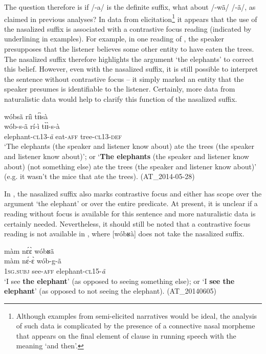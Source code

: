 \documentclass[output=paper]{langsci/langscibook}
\begin{document}
The question therefore is if /-a/ is the definite suffix, what about /-wã/ {\Tilde} /-ã/, as claimed in previous analyses? In data from elicitation\footnote{Although examples from semi-elicited narratives would be ideal, the analysis of such data is complicated by the presence of a connective nasal morpheme that appears on the final element of clause in running speech with the meaning ‘and then’.} it appears that the use of the nasalized suffix is associated with a contrastive focus reading (indicated by underlining in examples). For example, in one reading of , the speaker presupposes that the listener believes some other entity to have eaten the trees. The nasalized suffix therefore highlights the argument ‘the elephants’ to correct this belief. However, even with the nasalized suffix, it is still possible to interpret the sentence without contrastive focus – it simply marked an entity that the speaker presumes is identifiable to the listener. Certainly, more data from naturalistic data would help to clarify this function of the nasalized suffix.

\ea\label{ex:teo:45}
\glll wóbsã{\rmfnm} ríì t\'ɪ\`ɪsà\\
 wób-s-ã rí-ì t\`ɪ\`ɪ-s-à\\
elephant-\textsc{cl13-}\textit{ã} eat-\textsc{aff} tree-\textsc{cl13-def}\\
\glt ‘The elephants (the speaker and listener know about) ate the trees (the speaker and listener know about)’; or ‘\textbf{The elephants} (the speaker and listener know about) (not something else) ate the trees (the speaker and listener know about)’ (e.g. it wasn’t the mice that ate the trees). (AT\_2014-05-28)
\z
{}

In , the nasalized suffix also marks contrastive focus and either has scope over the argument ‘the elephant’ or over the entire predicate. At present, it is unclear if a reading without focus is available for this sentence and more naturalistic data is certainly needed. Nevertheless, it should still be noted that a contrastive focus reading is not available in , where [wóbʁà] does not take the nasalized suffix.


\ea\label{ex:teo:46}
\glll màm n\'ɛ\`ɛ wóbʁã\\
 màm n\'ɛ-\`ɛ wób-g-ã\\
\textsc{1sg.subj} see-\textsc{aff} elephant-\textsc{cl15}-\textit{ã}\\
\glt ‘I see \textbf{the elephant}’ (as opposed to seeing something else); or ‘I \textbf{see the elephant}’ (as opposed to not seeing the elephant). (AT\_20140605)
\z
\end{document}
